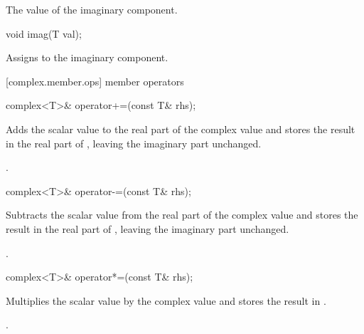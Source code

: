 \begin{itemdescr}
\pnum
\returns The value of the imaginary component.
\end{itemdescr}

%
\begin{itemdecl}
void imag(T val);
\end{itemdecl}

\begin{itemdescr}
\pnum
\effects Assigns  to the imaginary component.
\end{itemdescr}

[complex.member.ops]{ member operators}

%
\begin{itemdecl}
complex<T>& operator+=(const T& rhs);
\end{itemdecl}

\begin{itemdescr}
\pnum
\effects
Adds the scalar value  to the real part of the complex value
and stores the result in the real part of
,
leaving the imaginary part unchanged.

\pnum
\returns
{}.
\end{itemdescr}

%
\begin{itemdecl}
complex<T>& operator-=(const T& rhs);
\end{itemdecl}

\begin{itemdescr}
\pnum
\effects
Subtracts the scalar value  from the real part of the complex value
and stores the result in the real part of
,
leaving the imaginary part unchanged.

\pnum
\returns
{}.
\end{itemdescr}

%
\begin{itemdecl}
complex<T>& operator*=(const T& rhs);
\end{itemdecl}

\begin{itemdescr}
\pnum
\effects
Multiplies the scalar value  by the complex value
and stores the result in
.

\pnum
\returns
{}.
\end{itemdescr}

